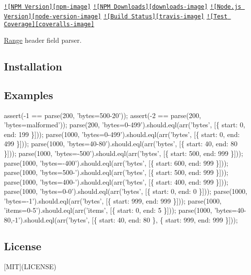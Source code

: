 \href{https://npmjs.org/package/range-parser}{\tt !\mbox{[}N\+P\+M Version\mbox{]}\mbox{[}npm-\/image\mbox{]}} \href{https://npmjs.org/package/range-parser}{\tt !\mbox{[}N\+P\+M Downloads\mbox{]}\mbox{[}downloads-\/image\mbox{]}} \href{http://nodejs.org/download/}{\tt !\mbox{[}Node.\+js Version\mbox{]}\mbox{[}node-\/version-\/image\mbox{]}} \href{https://travis-ci.org/jshttp/range-parser}{\tt !\mbox{[}Build Status\mbox{]}\mbox{[}travis-\/image\mbox{]}} \href{https://coveralls.io/r/jshttp/range-parser}{\tt !\mbox{[}Test Coverage\mbox{]}\mbox{[}coveralls-\/image\mbox{]}}

\hyperlink{struct_range}{Range} header field parser.

\subsection*{Installation}




\subsection*{Examples}


\begin{DoxyCode}
assert(-1 == parse(200, \textcolor{stringliteral}{'bytes=500-20'}));
assert(-2 == parse(200, \textcolor{stringliteral}{'bytes=malformed'}));
parse(200, \textcolor{stringliteral}{'bytes=0-499'}).should.eql(arr(\textcolor{stringliteral}{'bytes'}, [\{ start: 0, end: 199 \}]));
parse(1000, \textcolor{stringliteral}{'bytes=0-499'}).should.eql(arr(\textcolor{stringliteral}{'bytes'}, [\{ start: 0, end: 499 \}]));
parse(1000, \textcolor{stringliteral}{'bytes=40-80'}).should.eql(arr(\textcolor{stringliteral}{'bytes'}, [\{ start: 40, end: 80 \}]));
parse(1000, \textcolor{stringliteral}{'bytes=-500'}).should.eql(arr(\textcolor{stringliteral}{'bytes'}, [\{ start: 500, end: 999 \}]));
parse(1000, \textcolor{stringliteral}{'bytes=-400'}).should.eql(arr(\textcolor{stringliteral}{'bytes'}, [\{ start: 600, end: 999 \}]));
parse(1000, \textcolor{stringliteral}{'bytes=500-'}).should.eql(arr(\textcolor{stringliteral}{'bytes'}, [\{ start: 500, end: 999 \}]));
parse(1000, \textcolor{stringliteral}{'bytes=400-'}).should.eql(arr(\textcolor{stringliteral}{'bytes'}, [\{ start: 400, end: 999 \}]));
parse(1000, \textcolor{stringliteral}{'bytes=0-0'}).should.eql(arr(\textcolor{stringliteral}{'bytes'}, [\{ start: 0, end: 0 \}]));
parse(1000, \textcolor{stringliteral}{'bytes=-1'}).should.eql(arr(\textcolor{stringliteral}{'bytes'}, [\{ start: 999, end: 999 \}]));
parse(1000, \textcolor{stringliteral}{'items=0-5'}).should.eql(arr(\textcolor{stringliteral}{'items'}, [\{ start: 0, end: 5 \}]));
parse(1000, \textcolor{stringliteral}{'bytes=40-80,-1'}).should.eql(arr(\textcolor{stringliteral}{'bytes'}, [\{ start: 40, end: 80 \}, \{ start: 999, end: 999 \}]));
\end{DoxyCode}


\subsection*{License}

\mbox{[}M\+I\+T\mbox{]}(L\+I\+C\+E\+N\+S\+E) 